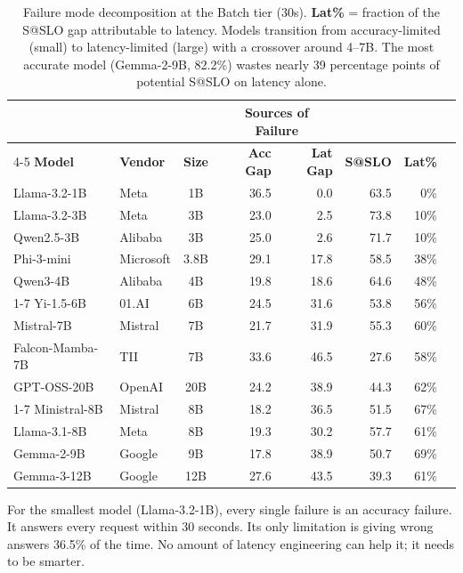 \documentclass[11pt]{article}
\begin{document}
\begin{table}[t]
\centering
\caption{Failure mode decomposition at the Batch tier (30s).  \textbf{Lat\%} = fraction of the S@SLO gap attributable to latency.  Models transition from accuracy-limited (small) to latency-limited (large) with a crossover around 4--7B. The most accurate model (Gemma-2-9B, 82.2\%) wastes nearly 39 percentage points of potential S@SLO on latency alone.}
\label{tab:failure-modes}
\small
\begin{tabular}{llc rr rr r}
\toprule
& & & \multicolumn{2}{c}{\textbf{Sources of Failure}} & & \\
\cmidrule(lr){4-5}
\textbf{Model} & \textbf{Vendor} & \textbf{Size} & \textbf{Acc Gap} & \textbf{Lat Gap} & \textbf{S@SLO} & \textbf{Lat\%} \\
\midrule
Llama-3.2-1B    & Meta      & 1B   & 36.5 & \phantom{0}0.0 & 63.5 & \phantom{0}0\% \\
Llama-3.2-3B    & Meta      & 3B   & 23.0 & \phantom{0}2.5 & 73.8 & 10\% \\
Qwen2.5-3B      & Alibaba   & 3B   & 25.0 & \phantom{0}2.6 & 71.7 & 10\% \\
Phi-3-mini       & Microsoft & 3.8B & 29.1 & 17.8 & 58.5 & 38\% \\
Qwen3-4B         & Alibaba   & 4B   & 19.8 & 18.6 & 64.6 & 48\% \\
\cmidrule(lr){1-7}
Yi-1.5-6B        & 01.AI     & 6B   & 24.5 & 31.6 & 53.8 & 56\% \\
Mistral-7B       & Mistral   & 7B   & 21.7 & 31.9 & 55.3 & 60\% \\
Falcon-Mamba-7B  & TII       & 7B   & 33.6 & 46.5 & 27.6 & 58\% \\
GPT-OSS-20B      & OpenAI    & 20B  & 24.2 & 38.9 & 44.3 & 62\% \\
\cmidrule(lr){1-7}
Ministral-8B     & Mistral   & 8B   & 18.2 & 36.5 & 51.5 & 67\% \\
Llama-3.1-8B     & Meta      & 8B   & 19.3 & 30.2 & 57.7 & 61\% \\
Gemma-2-9B       & Google    & 9B   & 17.8 & 38.9 & 50.7 & 69\% \\
Gemma-3-12B      & Google    & 12B  & 27.6 & 43.5 & 39.3 & 61\% \\
\bottomrule
\end{tabular}
\end{table}

For the smallest model (Llama-3.2-1B), every single failure is an accuracy failure.  It answers every request within 30 seconds.  Its only limitation is giving wrong answers 36.5\% of the time.  No amount of latency engineering can help it; it needs to be smarter.
\end{document}
